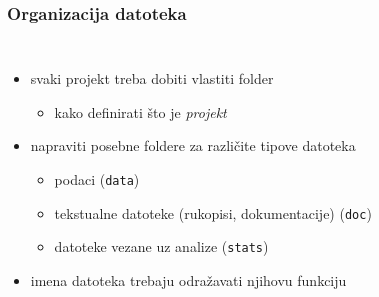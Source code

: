 \documentclass[aspectratio=169]{beamer}
\newenvironment{noheadline}{
    \setbeamertemplate{headline}{}
}{}
\begin{document}
\begin{noheadline}
    \begin{frame}
        \frametitle{Organizacija datoteka}

        \begin{columns}

            \begin{itemize}
                \setlength{\itemsep}{2em}

                \item svaki projekt treba dobiti vlastiti folder

                \begin{itemize}
                    \item kako definirati što je \textit{projekt}
                \end{itemize}

                \pause

                \item napraviti posebne foldere za različite tipove datoteka

                \begin{itemize}
                    \item podaci (\texttt{data})

                    \item tekstualne datoteke (rukopisi, dokumentacije)
                        (\texttt{doc})

                    \item datoteke vezane uz analize (\texttt{stats})

                \end{itemize}

                \pause

                \item imena datoteka trebaju odražavati njihovu funkciju

            \end{itemize}
            
            \pause



\end{columns}
\end{frame}
\end{noheadline}
\end{document}
